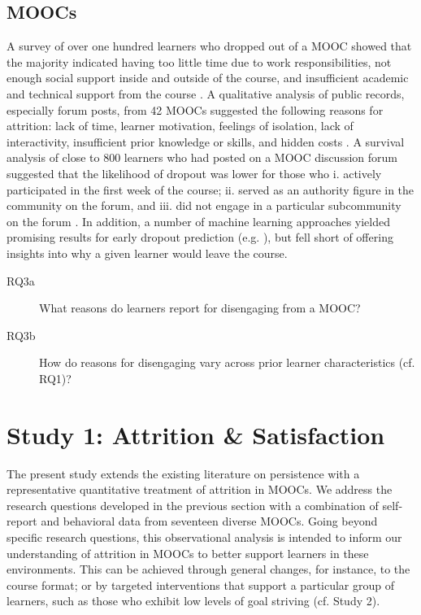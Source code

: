 \documentclass{sigchi}\usepackage[]{graphicx}\usepackage[]{color}
\begin{document}
\subsection{MOOCs}

A survey of over one hundred learners who dropped out of a MOOC showed that the majority indicated having too little time due to work responsibilities, not enough social support inside and outside of the course, and insufficient academic and technical support from the course \cite{gutl2014attrition}. A qualitative analysis of public records, especially forum posts, from 42 MOOCs suggested the following reasons for attrition: lack of time, learner motivation, feelings of isolation, lack of interactivity, insufficient prior knowledge or skills, and hidden costs \cite{khalil2014moocs}. A survival analysis of close to 800 learners who had posted on a MOOC discussion forum suggested that the likelihood of dropout was lower for those who i. actively participated in the first week of the course; ii. served as an authority figure in the community on the forum, and iii. did not engage in a particular subcommunity on the forum \cite{yang2013turn}. In addition, a number of machine learning approaches yielded promising results for early dropout prediction (e.g. \cite{taylor2014likely,halawa2014dropout}), but fell short of offering insights into why a given learner would leave the course.

\begin{description}
\item[RQ3a] What reasons do learners report for disengaging from a MOOC?
\item[RQ3b] How do reasons for disengaging vary across prior learner characteristics (cf. RQ1)?
\end{description}  

\section{Study 1: Attrition \& Satisfaction}

The present study extends the existing literature on persistence with a representative quantitative treatment of attrition in MOOCs. We address the research questions developed in the previous section with a combination of self-report and behavioral data from seventeen diverse MOOCs. Going beyond specific research questions, this observational analysis is intended to inform our understanding of attrition in MOOCs to better support learners in these environments. This can be achieved through general changes, for instance, to the course format; or by targeted interventions that support a particular group of learners, such as those who exhibit low levels of goal striving (cf. Study 2).
\end{document}
